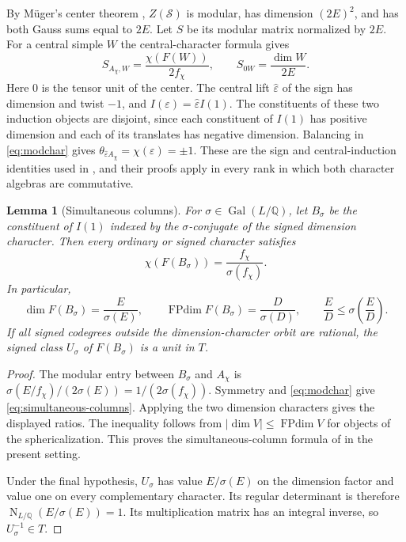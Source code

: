 \documentclass[11pt,a4paper]{article}
\newtheorem{lemma}[theorem]{Lemma}
\numberwithin{equation}{section}
\begin{document}
By M\"uger's center theorem \cite[Theorem~1.2]{MugerCenter},
$Z(\mathcal S)$ is modular, has dimension $(2E)^2$, and has
both Gauss sums equal to $2E$. Let $S$ be its modular matrix
normalized by $2E$. For a
central simple $W$ the central-character formula gives
\begin{equation}\label{eq:modchar}
 S_{A_\chi,W}=\frac{\chi(F(W))}{2f_\chi},\qquad
 S_{0W}=\frac{\dim W}{2E}.
\end{equation}
Here $0$ is the tensor unit of the center.
The central lift $\widehat\varepsilon$ of the sign has dimension and twist
$-1$, and $I(\varepsilon)=\widehat\varepsilon I(1)$. The constituents of
these two induction objects are disjoint, since each constituent of $I(1)$ has positive
dimension and each of its translates has negative dimension.
Balancing in \eqref{eq:modchar} gives
$\theta_{\widehat\varepsilon A_\chi}=\chi(\varepsilon)=\pm1$.
These are the sign and central-induction identities used in
\cite[Section 2]{Rank4}, and their proofs apply in every rank in which both
character algebras are commutative.

\begin{lemma}[Simultaneous columns]\label{lem:simultaneous-columns}
For $\sigma\in\operatorname{Gal}(L/\mathbb Q)$, let $B_\sigma$ be the
constituent of $I(1)$ indexed by the $\sigma$-conjugate of the signed
dimension character. Then every ordinary or signed character satisfies
\begin{equation}\label{eq:simultaneous-columns}
 \chi(F(B_\sigma))=\frac{f_\chi}{\sigma(f_\chi)}.
\end{equation}
In particular,
\[
 \dim F(B_\sigma)=\frac E{\sigma(E)},\qquad
 \operatorname{FPdim}F(B_\sigma)=\frac D{\sigma(D)},\qquad
 \frac ED\le\sigma\!\left(\frac ED\right).
\]
If all signed codegrees outside the dimension-character orbit are
rational, the signed class $U_\sigma$ of $F(B_\sigma)$ is a unit in $T$.
\end{lemma}
\begin{proof}
The modular entry between $B_\sigma$ and $A_\chi$ is
$\sigma(E/f_\chi)/(2\sigma(E))=1/(2\sigma(f_\chi))$.
Symmetry and \eqref{eq:modchar} give
\eqref{eq:simultaneous-columns}. Applying the two dimension characters
gives the displayed ratios. The inequality follows from
$|\dim V|\le\operatorname{FPdim}V$ for objects of the sphericalization.
This proves the simultaneous-column formula of
\cite[Proposition~6.1]{Rank4} in the present setting.

Under the final hypothesis, $U_\sigma$ has value $E/\sigma(E)$ on the
dimension factor and value one on every complementary character. Its
regular determinant is therefore $\operatorname{N}_{L/\mathbb Q}
(E/\sigma(E))=1$. Its multiplication matrix has an integral inverse,
so $U_\sigma^{-1}\in T$.
\end{proof}
\end{document}
